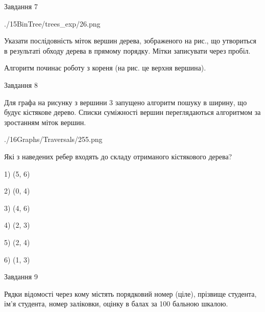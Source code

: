 \documentclass[12pt, ukrainian]{article}
\begin{document}
{\vspace{10mm}\par

\newpage
\begin{minipage}[t]{9.7cm}
               
{\begin{center}Завдання {7}\end{center}}
\vspace{-6mm}

\begin{center}
	{./15BinTree/trees_exp/26.png}
\end{center}
Указати послідовність міток вершин дерева, зображеного на рис., що утвориться в результаті обходу дерева в прямому порядку. Мітки записувати через пробіл.\par Алгоритм починає роботу з кореня (на рис. це верхня вершина).\par

\end{minipage}
\vline \hspace{8mm}
\begin{minipage}[t]{8.0cm}
               
{\begin{center}Завдання {8}\end{center}}
\vspace{-6mm}
Для графа на рисунку з вершини 3 запущено алгоритм пошуку в ширину, що будує кістякове дерево. Списки суміжності вершин переглядаються алгоритмом за зростанням міток вершин.\par
\begin{center}
	{./16Graphs/Traversals/255.png}
\end{center}
\par Які з наведених ребер входять до складу отриманого кістякового дерева?\par
1) (5, 6)\par
2) (0, 4)\par
3) (4, 6)\par
4) (2, 3)\par
5) (2, 4)\par
6) (1, 3)\par
{\vskip 15pt} \par

\end{minipage}

               
{\begin{center}Завдання {9}\end{center}}
\vspace{-6mm}
Рядки відомості через кому містять порядковий номер (ціле), пріз\-ви\-ще студен\-та, ім'я студента, номер заліковки, оцінку в балах за 100 бальною шкалою.

}
\end{document}
